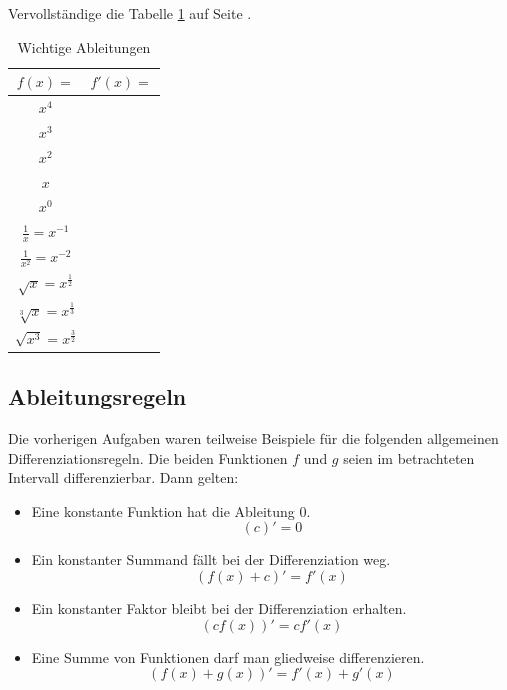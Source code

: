 \documentclass[%
11pt,%
twoside,%
titlepage,%
german,%
headsepline%
]{scrartcl}
\begin{document}
\begin{ueb}\label{uebtabelle}
Vervollst\"andige
die Tabelle \ref{tab:abl} auf Seite \pageref{tab:abl}.

\begin{table}
\Huge
\begin{center}
\begin{tabular}{|c|c|}
\hline
\rule[-5mm]{0pt}{13mm}$f(x)=$ & $f'(x)=$\\ \hline
\rule[-5mm]{0pt}{15mm}$x^4$ & \\ \hline
\rule[-5mm]{0pt}{15mm}$x^3$ & \\ \hline
\rule[-5mm]{0pt}{15mm}$x^2$ & \\ \hline
\rule[-5mm]{0pt}{15mm}$x$ & \\ \hline
\rule[-5mm]{0pt}{15mm}$x^0$ & \\ \hline
\rule[-5mm]{0pt}{15mm}$\frac{1}{x}=x^{-1}$ & \\ \hline
\rule[-6mm]{0pt}{16mm}$\frac{1}{x^2}=x^{-2}$ & \\ \hline
\rule[-5mm]{0pt}{17mm}$\sqrt{x}=x^{\frac{1}{2}}$ & \\ \hline
\rule[-5mm]{0pt}{17mm}$\sqrt[3]{x}=x^{\frac{1}{3}}$ & \\ \hline
\rule[-5mm]{0pt}{17mm}$\sqrt{x^3}=x^{\frac{3}{2}}$ & \\ \hline
\end{tabular}
\caption{Wichtige Ableitungen}\label{tab:abl}
\end{center}
\end{table}
\end{ueb}

\subsection{Ableitungsregeln}

Die
vorherigen Aufgaben waren teilweise Beispiele f\"ur die folgenden allgemeinen Differenziations\-regeln. Die beiden Funktionen $f$ und $g$ seien im betrachteten Intervall differenzierbar. Dann gelten:

\begin{itemize}
\item Eine konstante Funktion hat die Ableitung $0$.
$$(c)'=0$$
\item Ein konstanter Summand f\"allt bei der Differenziation weg.
$$(f(x)+c)'= f'(x)$$
\item Ein konstanter Faktor bleibt bei der Differenziation erhalten.
$$(cf(x))'=cf'(x)$$
\item Eine Summe von Funktionen darf man gliedweise differenzieren.
$$(f(x)+g(x))'=f'(x)+g'(x)$$
\end{itemize}
\end{document}
